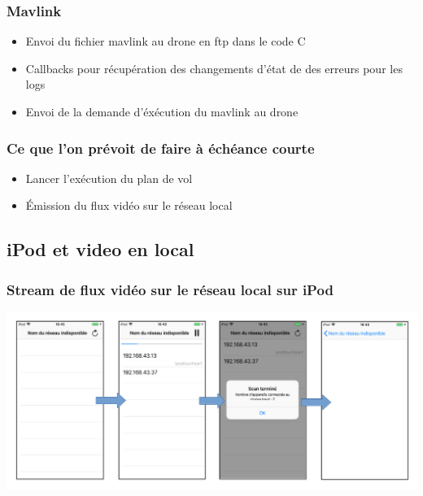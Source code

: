 \documentclass{beamer}
\begin{document}
	\begin{frame}
		\begin{center}
		\frametitle{Mavlink}
           	\begin{itemize}
                \item Envoi du fichier mavlink au drone en ftp dans le code C
                \item Callbacks pour récupération des changements d'état de des erreurs pour les logs
                \item Envoi de la demande d'éxécution du mavlink au drone
            \end{itemize}
		\end{center}
	\end{frame}
	
	\begin{frame}
	\frametitle{Ce que l'on prévoit de faire à échéance courte}
	\begin{itemize}
		\item Lancer l'exécution du plan de vol
		\item Émission du flux vidéo sur le réseau local
	\end{itemize}
	\end{frame}
	
	\begin{frame}
	\section{iPod et video en local}
		\begin{center}
		\frametitle{Stream de flux vidéo sur le réseau local sur iPod}
		\includegraphics[scale=0.37]{iPod_file_finder.png}
		\end{center}	
	\end{frame}
	
\end{document}
